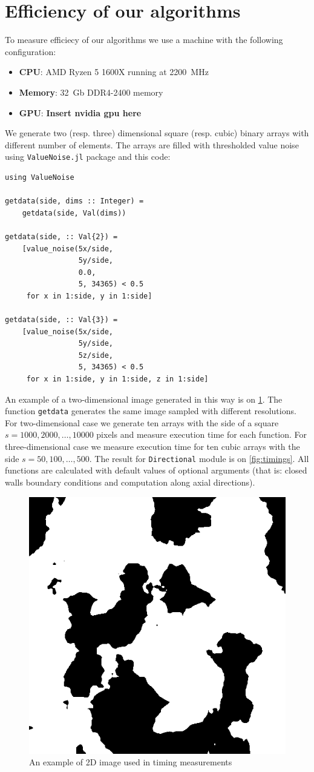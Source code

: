 \documentclass[reprint,amsmath,amssymb,aps,pre]{revtex4-1}
\newcommand{\code}[1]{\colorbox{light-gray}{\texttt{#1}}}
\begin{document}
\section{Efficiency of our algorithms}

To measure efficiecy of our algorithms we use a machine with the following
configuration:
\begin{itemize}
\item \textbf{CPU}: AMD Ryzen 5 1600X running at 2200~MHz
\item \textbf{Memory}: 32~Gb DDR4-2400 memory
\item \textbf{GPU}: \textbf{Insert nvidia gpu here}
\end{itemize}

We generate two (resp. three) dimensional square (resp. cubic) binary arrays
with different number of elements. The arrays are filled with thresholded value
noise using \code{ValueNoise.jl} package and this code:
\begin{verbatim}
using ValueNoise

getdata(side, dims :: Integer) =
    getdata(side, Val(dims))

getdata(side, :: Val{2}) =
    [value_noise(5x/side,
                 5y/side,
                 0.0,
                 5, 34365) < 0.5
     for x in 1:side, y in 1:side]

getdata(side, :: Val{3}) =
    [value_noise(5x/side,
                 5y/side,
                 5z/side,
                 5, 34365) < 0.5
     for x in 1:side, y in 1:side, z in 1:side]
\end{verbatim}
An example of a two-dimensional image generated in this way is on
\cref{fig:valuenoise}. The function \code{getdata} generates the same image
sampled with different resolutions. For two-dimensional case we generate ten
arrays with the side of a square $s = 1000, 2000, \dots, 10000$ pixels and
measure execution time for each function. For three-dimensional case we measure
execution time for ten cubic arrays with the side $s = 50, 100, \dots, 500$. The
result for \code{Directional} module is on \cref{fig:timings}. All functions are
calculated with default values of optional arguments (that is: closed walls
boundary conditions and computation along axial directions).

\begin{figure}[ht]
  \centering
  \includegraphics[width=.3\textwidth]{images/timing-image.png}
  \caption[]{{\small An example of 2D image used in timing measurements}}
  \label{fig:valuenoise}
\end{figure}
\end{document}
